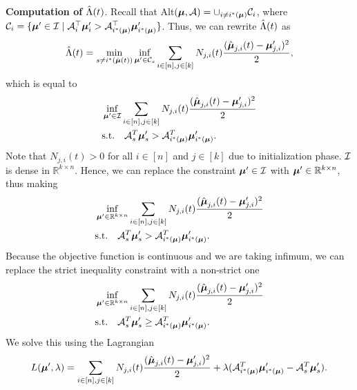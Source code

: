         \textbf{Computation of $\hat{\Lambda}(t)$}.
            Recall that Alt$(\boldsymbol{\mu}, \mathcal{A}) = \cup_{i \neq i^*(\boldsymbol{\mu})} \mathcal{C}_i$,  where $\mathcal{C}_i = \{ \boldsymbol{\mu}' \in \mathcal{I} \mid \mathcal{A}_i^\top \boldsymbol{\mu}'_i > \mathcal{A}_{i^*(\boldsymbol{\mu})}^\top \boldsymbol{\mu}'_{i^*(\boldsymbol{\mu})} \}$. Thus, we can rewrite $\hat{\Lambda}(t)$ as
            $$
                \hat{\Lambda}(t) = \min_{s \neq  i^*(\hat{\boldsymbol{\mu}}(t))} \inf_{\boldsymbol{\mu}' \in \mathcal{C}_s} \sum_{i \in [n], j \in [k]} N_{j,i}(t) \frac{(\hat{\boldsymbol{\mu}}_{j,i}(t) - \boldsymbol{\mu}'_{j,i})^2}{2},
            $$
            which is equal to
            \begin{align*}
                &\inf_{\boldsymbol{\mu}' \in \mathcal{I}} \sum_{i \in [n], j \in [k]} N_{j,i}(t) \frac{(\hat{\boldsymbol{\mu}}_{j,i}(t) - \boldsymbol{\mu}'_{j,i})^2}{2} \\
                & \text{s.t.} \quad \mathcal{A}_s^T \boldsymbol{\mu}'_s > \mathcal{A}_{i^*(\boldsymbol{\mu})}^T \boldsymbol{\mu}'_{i^*(\boldsymbol{\mu})}.
            \end{align*}
            Note that $N_{j,i}(t) > 0$ for all $i\in [n]$ and $j \in [k]$ due to initialization phase. \(\mathcal{I}\) is dense in \(\mathbb{R}^{k \times n}\). Hence, we can replace the constraint \(\boldsymbol{\mu}' \in \mathcal{I}\) with \(\boldsymbol{\mu}' \in \mathbb{R}^{k \times n}\), thus making
            \begin{align*}
                &\inf_{\boldsymbol{\mu}' \in \mathbb{R}^{k \times n}} \sum_{i \in [n], j \in [k]} N_{j,i}(t) \frac{(\hat{\boldsymbol{\mu}}_{j,i}(t) - \boldsymbol{\mu}'_{j,i})^2}{2} \\
                & \text{s.t.} \quad \mathcal{A}_s^T \boldsymbol{\mu}'_s > \mathcal{A}_{i^*(\boldsymbol{\mu})}^T \boldsymbol{\mu}'_{i^*(\boldsymbol{\mu})}.
            \end{align*}
            Because the objective function is continuous and we are taking infimum, we can replace the strict inequality constraint with a non-strict one
            \begin{align*}
                &\inf_{\boldsymbol{\mu}' \in \mathbb{R}^{k \times n}} \sum_{i \in [n], j \in [k]} N_{j,i}(t) \frac{(\hat{\boldsymbol{\mu}}_{j,i}(t) - \boldsymbol{\mu}'_{j,i})^2}{2} \\
                & \text{s.t.} \quad \mathcal{A}_s^T \boldsymbol{\mu}'_s \geq \mathcal{A}_{i^*(\boldsymbol{\mu})}^T \boldsymbol{\mu}'_{i^*(\boldsymbol{\mu})}.
            \end{align*} 
            We solve this using the Lagrangian
            \begin{equation}\label{eq: lag-glr-non}
                   L(\boldsymbol{\mu}', \lambda) = \sum_{i \in [n], j \in [k]} N_{j,i}(t) \frac{(\hat{\boldsymbol{\mu}}_{j,i}(t) - \boldsymbol{\mu}'_{j,i})^2}{2}+ \lambda(\mathcal{A}_{i^*(\boldsymbol{\mu})}^T \boldsymbol{\mu}'_{i^*(\boldsymbol{\mu})} - \mathcal{A}_s^T \boldsymbol{\mu}'_s).
            \end{equation}

